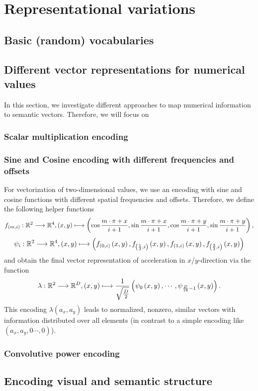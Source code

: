 \section{Representational variations}
\subsection{Basic (random) vocabularies}
\subsection{Different vector representations for numerical values}
In this section, we investigate different approaches to map numerical information to semantic vectors.
Therefore, we will focus on
\subsubsection{Scalar multiplication encoding}
\subsubsection{Sine and Cosine encoding with different frequencies and offsets}
For vectorization of two-dimensional values, we use an encoding with sine and cosine functions with different spatial frequencies and offsets.
Therefore, we define the following helper functions
\[ f_{\left(m,i\right)}: \mathbb{R}^2 \longrightarrow \mathbb{R}^4, \left(x,y\right) \longmapsto \left(\cos\frac{m\cdot \pi + x}{i + 1}, \sin\frac{m\cdot \pi + x}{i + 1}, \cos\frac{m\cdot \pi + y}{i + 1}, \sin\frac{m\cdot \pi + y}{i + 1}\right),
\]
\[
\psi_i: \mathbb{R}^2 \longrightarrow \mathbb{R}^4, \left(x,y\right) \longmapsto \left(f_{\left(0,i\right)}\left(x,y\right), f_{\left(\frac{1}{2},i\right)}\left(x,y\right), f_{\left(1,i\right)}\left(x,y\right), f_{\left(\frac{3}{2},i\right)}\left(x,y\right)\right)
\]
and obtain the final vector representation of acceleration in $x$/$y$-direction via the function
\[
\lambda: \mathbb{R}^2 \longrightarrow \mathbb{R}^D, \left(x,y\right) \longmapsto \frac{1}{\sqrt{\frac{D}{2}}}\left(\psi_0\left(x,y\right), \cdots, \psi_{\frac{D}{16}-1}\left(x,y\right)\right).
\]
This encoding $\lambda\left(a_x, a_y\right)$ leads to normalized, nonzero, similar vectors with information distributed over all elements (in contrast to a simple encoding like $\left(a_x, a_y, 0 \cdots, 0\right)$).
\subsubsection{Convolutive power encoding}
\subsection{Encoding visual and semantic structure}
